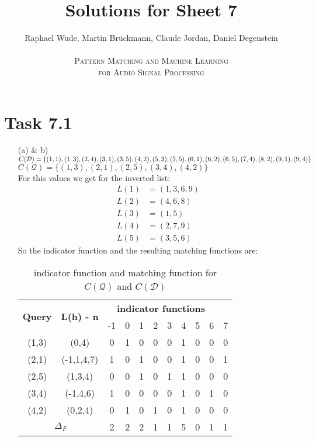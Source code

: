 \documentclass[12pt]{article}
\begin{document}
\title{Solutions for Sheet 7}
\author{Raphael Wude, Martin Brückmann, Claude Jordan, Daniel Degenstein\\ \\
\textsc{Pattern Matching and Machine Learning} \\
\textsc{for Audio Signal Processing}}
\maketitle

\section*{Task 7.1}
\begin{itemize}
    \item[(a) \& b)]
    $C(\mathcal{D}) = \{(1,1), (1,3), (2,4), (3,1), (3,5), (4,2), (5,3),\\
    (5,5), (6,1), (6,2), (6,5), (7,4), (8,2), (9,1), (9,4)\}$\\
    $C(\mathcal{Q})=\{(1,3), (2,1), (2,5), (3,4), (4,2)\}$\\
    For this values we get for the inverted list:
    \begin{align*}
      L(1) &= (1,3,6,9)\\
      L(2) &= (4,6,8)\\
      L(3) &= (1,5)\\
      L(4) &= (2,7,9)\\
      L(5) &= (3,5,6)
    \end{align*}
    So the indicator function and the resulting matching functions are:
    \begin{table}[h]
\centering
\begin{tabular}{c|c|c|c|c|c|c|c|c|c|c}
    \multirow{2}{*}{\textbf{Query}} & \multirow{2}{*}{\textbf{L(h) - n}}& \multicolumn{8}{c}{\textbf{indicator functions}}  \\
     & & -1 & 0 & 1 & 2 & 3 & 4 & 5 & 6 & 7\\
     \hline
     (1,3) & (0,4) & 0&1&0&0&0&1&0&0&0\\
     (2,1) & (-1,1,4,7) & 1&0&1&0&0&1&0&0&1\\
     (2,5) & (1,3,4) & 0&0&1&0&1&1&0&0&0\\
     (3,4) & (-1,4,6) & 1&0&0&0&0&1&0&1&0\\
     (4,2) & (0,2,4) & 0&1&0&1&0&1&0&0&0\\
       \hline
     \multicolumn{2}{c}{$\Delta_F$} &2&2&2&1&1&5&0&1&1
\end{tabular}
\caption{indicator function and matching function for $C(\mathcal{Q})$ and $C(\mathcal{D})$}
\label{tab:ind_func}
\end{table}

\end{itemize}
\end{document}
